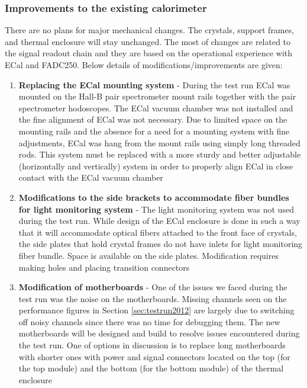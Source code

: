 \subsubsection{Improvements to the existing calorimeter}

There are no plans for major mechanical changes. The crystals, support frames, and thermal enclosure will stay unchanged. The most of changes are related to the signal readout chain and they are based on the operational experience with ECal and FADC250. Below details of modifications/improvements are given: 

\begin{enumerate}
\item {\bf Replacing the ECal mounting system} - 
During the test run ECal was mounted on the Hall-B pair spectrometer mount rails together with the pair spectrometer hodoscopes. The ECal vacuum chamber was not installed and the fine alignment of ECal was not necessary. Due to limited space on the mounting rails and the absence for a need for a mounting system with fine adjustments, ECal was hang from the mount rails using simply long threaded rods. This system must be replaced with a more sturdy and better adjustable (horizontally and vertically) system in order to properly align ECal in close contact with the ECal vacuum chamber

\item {\bf Modifications to the side brackets to accommodate fiber bundles for light monitoring system} -
The light monitoring system was not used during the test run. While design of the ECal enclosure is done in such a way that it will accommodate optical fibers attached to the front face of crystals, the side plates that hold crystal frames do not have inlets for light monitoring fiber bundle. Space is available on the side plates. Modification requires making holes and placing transition connectors  
    
\item {\bf Modification of motherboards} - One of the issues we faced during the test run was the noise on the motherboards. Missing channels seen on the performance figures in Section \ref{sec:testrun2012} are largely due to switching off noisy channels since there was no time for debugging them. The new motherboards will be designed and build to resolve issues encountered during the test run. One of options in discussion is to replace long motherboards with shorter ones with power and signal connectors located on the top (for the top module) and the bottom (for the bottom module) of the thermal enclosure


\end{enumerate}
